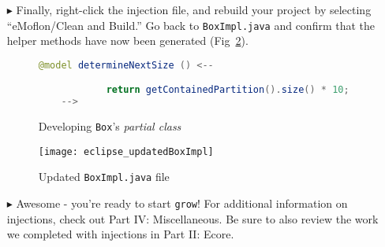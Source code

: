 \begin{itemize}
\vspace{0.5cm}

\item[$\blacktriangleright$] Finally, right-click the injection file, and rebuild your project by selecting ``eMoflon/Clean and Build.'' Go back to
\texttt{BoxImpl.java} and confirm that the helper methods have now been generated (Fig~\ref{fig:eclipse_updatedBoxImpl}).

\vspace{0.5cm}

\begin{figure}[h!]
        \centering
        \begin{lstlisting}[language=Java, keywordstyle={\bfseries\color{purple}}, backgroundcolor=\color{white}]
    @model determineNextSize () <--

            return getContainedPartition().size() * 10;
    -->

        \end{lstlisting}
        \caption{Developing \texttt{Box}'s \emph{partial class}}
        \label{code:determine_inject_file}
    \end{figure}
    \FloatBarrier

\newpage
\vspace*{1cm}

\begin{figure}[htbp]
    \centering
    \texttt{[image: eclipse\_updatedBoxImpl]}
    \caption{Updated \texttt{BoxImpl.java} file \update}
    \label{fig:eclipse_updatedBoxImpl}
\end{figure}

\vspace{0.5cm}

\item[$\blacktriangleright$] Awesome - you're ready to start \texttt{grow}! For additional information on injections, check out Part IV: Miscellaneous. Be sure
to also review the work we completed with injections in Part II: Ecore.


\end{itemize}